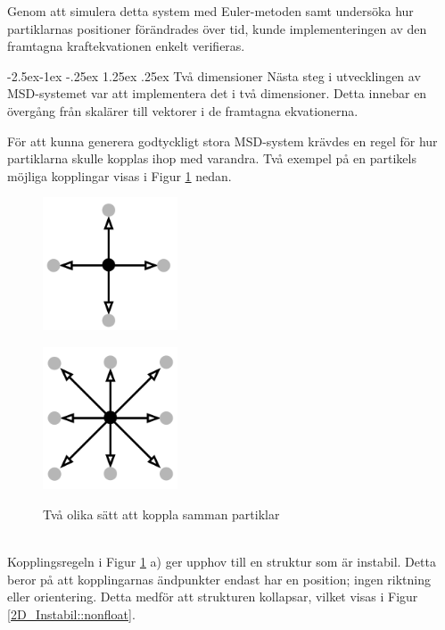 \documentclass[a4paper,12pt,oneside,final,swedish]{extarticle}
\makeatletter
\renewcommand\paragraph{\@startsection{paragraph}{4}{\z@}%
            {-2.5ex\@plus -1ex \@minus -.25ex}%
            {1.25ex \@plus .25ex}%
            {\normalfont\normalsize\bfseries}}
\makeatother
\begin{document}
\noindent Genom att simulera detta system med Euler-metoden samt undersöka hur partiklarnas positioner förändrades över tid, kunde implementeringen av den framtagna kraftekvationen enkelt verifieras.

\paragraph{Två dimensioner}
Nästa steg i utvecklingen av MSD-systemet var att implementera det i två dimensioner. 
Detta innebar en övergång från skalärer till vektorer i de framtagna ekvationerna.
\pagebreak


\noindent För att kunna generera godtyckligt stora MSD-system krävdes en regel för hur partiklarna skulle kopplas ihop med varandra. Två exempel på en partikels möjliga kopplingar visas i Figur \ref{2D_Neighbors::nonfloat} nedan.

\begin{figure}[h]
  \begin{minipage}[h!]{.5\linewidth}
    \centering
    \includegraphics[width=4cm]{Bilder/2D_4Neighbors.png} 
    \label{fig:1a}
  \end{minipage}
  \begin{minipage}[h!]{.5\linewidth}
    \centering
    \includegraphics[width=4cm]{Bilder/2D_8Neighbors.png} 
    \label{fig:1b}
  \end{minipage}
  \caption{Två olika sätt att koppla samman partiklar}
  \label{2D_Neighbors::nonfloat}
\end{figure}

\noindent \\Kopplingsregeln i Figur \ref{2D_Neighbors::nonfloat} a) ger upphov till en struktur som är instabil. Detta beror på att kopplingarnas ändpunkter endast har en position; ingen riktning eller orientering. Detta medför att strukturen kollapsar, vilket visas i Figur \ref{2D_Instabil::nonfloat}.
\end{document}
